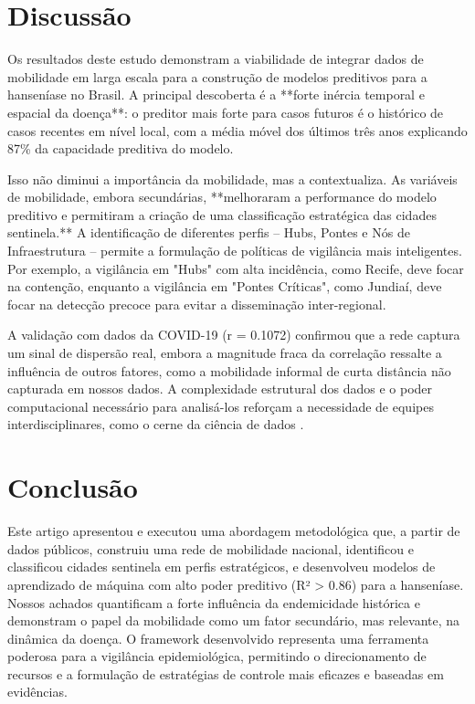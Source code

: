 \documentclass[preprint,12pt]{elsarticle}
\begin{document}
\section{Discussão}
Os resultados deste estudo demonstram a viabilidade de integrar dados de mobilidade em larga escala para a construção de modelos preditivos para a hanseníase no Brasil. A principal descoberta é a **forte inércia temporal e espacial da doença**: o preditor mais forte para casos futuros é o histórico de casos recentes em nível local, com a média móvel dos últimos três anos explicando 87\% da capacidade preditiva do modelo.

Isso não diminui a importância da mobilidade, mas a contextualiza. As variáveis de mobilidade, embora secundárias, **melhoraram a performance do modelo preditivo e permitiram a criação de uma classificação estratégica das cidades sentinela.** A identificação de diferentes perfis – Hubs, Pontes e Nós de Infraestrutura – permite a formulação de políticas de vigilância mais inteligentes. Por exemplo, a vigilância em "Hubs" com alta incidência, como Recife, deve focar na contenção, enquanto a vigilância em "Pontes Críticas", como Jundiaí, deve focar na detecção precoce para evitar a disseminação inter-regional.

A validação com dados da COVID-19 (r = 0.1072) confirmou que a rede captura um sinal de dispersão real, embora a magnitude fraca da correlação ressalte a influência de outros fatores, como a mobilidade informal de curta distância não capturada em nossos dados. A complexidade estrutural dos dados e o poder computacional necessário para analisá-los reforçam a necessidade de equipes interdisciplinares, como o cerne da ciência de dados \cite{saldanha2021definicao, saldanha2021nesse, tang2021fields}.

\section{Conclusão}
Este artigo apresentou e executou uma abordagem metodológica que, a partir de dados públicos, construiu uma rede de mobilidade nacional, identificou e classificou cidades sentinela em perfis estratégicos, e desenvolveu modelos de aprendizado de máquina com alto poder preditivo (R² > 0.86) para a hanseníase. Nossos achados quantificam a forte influência da endemicidade histórica e demonstram o papel da mobilidade como um fator secundário, mas relevante, na dinâmica da doença. O framework desenvolvido representa uma ferramenta poderosa para a vigilância epidemiológica, permitindo o direcionamento de recursos e a formulação de estratégias de controle mais eficazes e baseadas em evidências.
\end{document}
